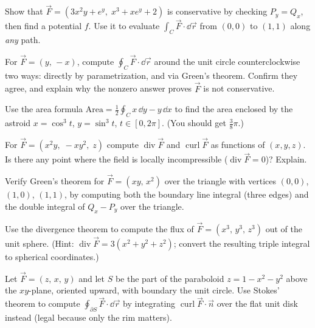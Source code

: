 \begin{exercise}
\label{ch35:exr-conservative}
Show that $\vec F=(3x^2y + e^y,\; x^3 + xe^y + 2)$ is conservative by checking
$P_y=Q_x$, then find a potential $f$. Use it to evaluate $\int_C\vec F\cdot\dd\vec r$
from $(0,0)$ to $(1,1)$ along \emph{any} path.
\end{exercise}

\begin{exercise}
\label{ch35:exr-notconservative}
For $\vec F=(y,\,-x)$, compute $\oint_C\vec F\cdot\dd\vec r$ around the unit circle
counterclockwise two ways: directly by parametrization, and via Green's theorem.
Confirm they agree, and explain why the nonzero answer proves $\vec F$ is not
conservative.
\end{exercise}

\begin{exercise}
\label{ch35:exr-green-area}
Use the area formula $\text{Area}=\tfrac12\oint_C x\,\dd y - y\,\dd x$ to find the
area enclosed by the astroid $x=\cos^3 t$, $y=\sin^3 t$, $t\in[0,2\pi]$. (You should
get $\tfrac{3}{8}\pi$.)
\end{exercise}

\begin{exercise}
\label{ch35:exr-divcurl}
For $\vec F=(x^2 y,\; -xy^2,\; z)$ compute $\operatorname{div}\vec F$ and
$\operatorname{curl}\vec F$ as functions of $(x,y,z)$. Is there any point where the
field is locally incompressible ($\operatorname{div}\vec F=0$)? Explain.
\end{exercise}

\begin{exercise}
\label{ch35:exr-greenverify}
Verify Green's theorem for $\vec F=(xy,\,x^2)$ over the triangle with vertices
$(0,0)$, $(1,0)$, $(1,1)$, by computing both the boundary line integral (three
edges) and the double integral of $Q_x-P_y$ over the triangle.
\end{exercise}

\begin{exercise}
\label{ch35:exr-divthm}
Use the divergence theorem to compute the flux of $\vec F=(x^3,\,y^3,\,z^3)$ out of
the unit sphere. (Hint: $\operatorname{div}\vec F = 3(x^2+y^2+z^2)$; convert the
resulting triple integral to spherical coordinates.)
\end{exercise}

\begin{exercise}
\label{ch35:exr-stokes}
Let $\vec F=(z,\,x,\,y)$ and let $S$ be the part of the paraboloid $z=1-x^2-y^2$
above the $xy$-plane, oriented upward, with boundary the unit circle. Use Stokes'
theorem to compute $\oint_{\partial S}\vec F\cdot\dd\vec r$ by integrating
$\operatorname{curl}\vec F\cdot\vec n$ over the flat unit disk instead (legal because
only the rim matters).
\end{exercise}

